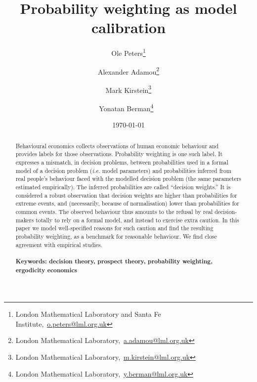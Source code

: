 \documentclass[11pt]{article}
\newcommand{\bc}{\begin{center}}
\newcommand{\ec}{\end{center}}
\newcommand{\red}[1]{\textcolor{red} {#1}}
\newcommand{\ie}{{\it i.e.}\xspace}
\numberwithin{equation}{section}
\begin{document}
\begin{titlepage}
\title{Probability weighting as model calibration}
\author{Ole Peters\footnote{London Mathematical Laboratory and Santa Fe Institute,~\url{o.peters@lml.org.uk}}  \and Alexander Adamou\footnote{London Mathematical Laboratory,~\url{a.adamou@lml.org.uk}} \and Mark Kirstein\footnote{London Mathematical Laboratory,~\url{m.kirstein@lml.org.uk}}  \and Yonatan Berman\footnote{London Mathematical Laboratory,~\url{y.berman@lml.org.uk}} \,\, %
}
\date{\today}
\maketitle


\begin{abstract}
\noindent 
Behavioural economics collects observations of human economic behaviour and provides labels for those observations. 
Probability weighting is one such label. It expresses a mismatch, in decision problems, between probabilities used in a formal model of a decision problem (\ie model parameters) and probabilities inferred from real people's behaviour faced with the modelled decision problem (the same parameters estimated empirically). The inferred probabilities are called ``decision weights.'' 
It is considered a robust observation that decision weights are higher than probabilities for extreme events, and (necessarily, because of normalisation) lower than probabilities for common events.
The observed behaviour thus amounts to the refusal by real decision-makers totally to rely on a formal model, and instead to exercise extra caution. In this paper we model well-specified reasons for such caution and find the resulting probability weighting, as a benchmark for reasonable behaviour. We find close agreement with empirical studies.
\\
\\


\noindent\textbf{Keywords: decision theory, prospect theory, probability weighting, ergodicity economics}

\end{abstract}
\setcounter{page}{0}
\thispagestyle{empty}
\end{titlepage}
\pagebreak \newpage
\end{document}
